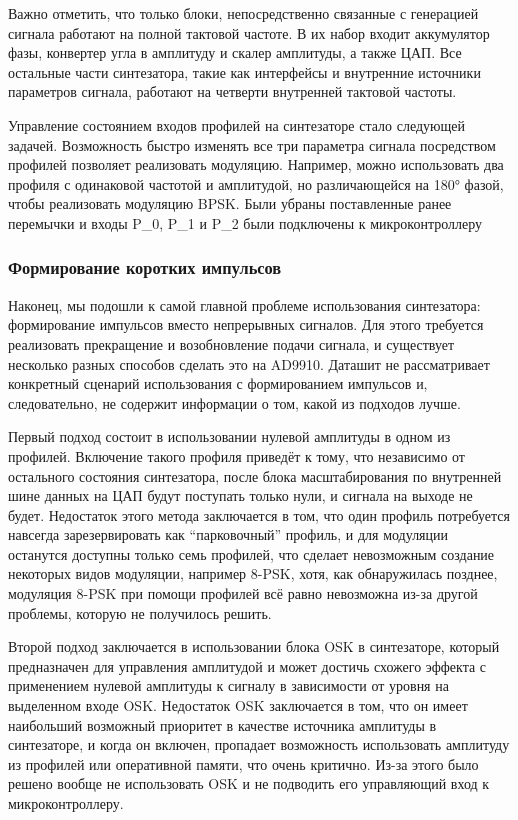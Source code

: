 \documentclass[rusmathsym, eqnumwithinsec, amspack, hyperref]{bomgost}
\begin{document}
Важно отметить, что только блоки, непосредственно связанные с генерацией сигнала работают на полной тактовой частоте. В их набор входит аккумулятор фазы, конвертер угла в амплитуду и скалер амплитуды, а также ЦАП. Все остальные части синтезатора, такие как интерфейсы и внутренние источники параметров сигнала, работают на четверти внутренней тактовой частоты.

Управление состоянием входов профилей на синтезаторе стало следующей задачей. Возможность быстро изменять все три параметра сигнала посредством профилей позволяет реализовать модуляцию. Например, можно использовать два профиля с одинаковой частотой и амплитудой, но различающейся на 180° фазой, чтобы реализовать модуляцию BPSK. Были убраны поставленные ранее перемычки и входы P\_0, P\_1 и P\_2 были подключены к микроконтроллеру

\subsubsection{Формирование коротких импульсов}

Наконец, мы подошли к самой главной проблеме использования синтезатора: формирование импульсов вместо непрерывных сигналов. Для этого требуется реализовать прекращение и возобновление подачи сигнала, и существует несколько разных способов сделать это на AD9910. Даташит не рассматривает конкретный сценарий использования с формированием импульсов и, следовательно, не содержит информации о том, какой из подходов лучше.

Первый подход состоит в использовании нулевой амплитуды в одном из профилей. Включение такого профиля приведёт к тому, что независимо от остального состояния синтезатора, после блока масштабирования по внутренней шине данных на ЦАП будут поступать только нули, и сигнала на выходе не будет. Недостаток этого метода заключается в том, что один профиль потребуется навсегда зарезервировать как ``парковочный'' профиль, и для модуляции останутся доступны только семь профилей, что сделает невозможным создание некоторых видов модуляции, например 8-PSK, хотя, как обнаружилась позднее, модуляция 8-PSK при помощи профилей всё равно невозможна из-за другой проблемы, которую не получилось решить.

Второй подход заключается в использовании блока OSK в синтезаторе, который предназначен для управления амплитудой и может достичь схожего эффекта с применением нулевой амплитуды к сигналу в зависимости от уровня на выделенном входе OSK. Недостаток OSK заключается в том, что он имеет наибольший возможный приоритет в качестве источника амплитуды в синтезаторе, и когда он включен, пропадает возможность использовать амплитуду из профилей или оперативной памяти, что очень критично. Из-за этого было решено вообще не использовать OSK и не подводить его управляющий вход к микроконтроллеру.
\end{document}
